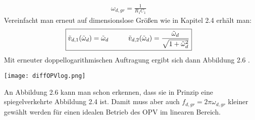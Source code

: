 \begin{gather}
    \boxed{\omega_{d,gr}=\frac{1}{R_1 C_1}}
\end{gather}
Vereinfacht man erneut auf dimensionslose Größen wie in Kapitel 2.4 erhält man:
\begin{gather}
    \boxed{\tilde{v}_{d,1}(\tilde{\omega}_d) = \tilde{\omega}_d \hspace*{1cm} \tilde{v}_{d,2}(\tilde{\omega}_d) =\frac{\tilde{\omega}_d}{\sqrt{1+\tilde{\omega}_d^2}}}
\end{gather}
Mit erneuter doppellogarithmischen Auftragung ergibt sich dann Abbildung 2.6 .
\begin{center}
    \texttt{[image: diffOPVlog.png]}
\end{center}
An Abbildung 2.6 kann man schon erkennen, dass sie in Prinzip eine spiegelverkehrte Abbildung 2.4 ist. Damit muss aber auch $f_{d,gr}=2\pi\omega_{d,gr}$ kleiner gewählt werden für einen idealen Betrieb des OPV im linearen Bereich.
\newpage
